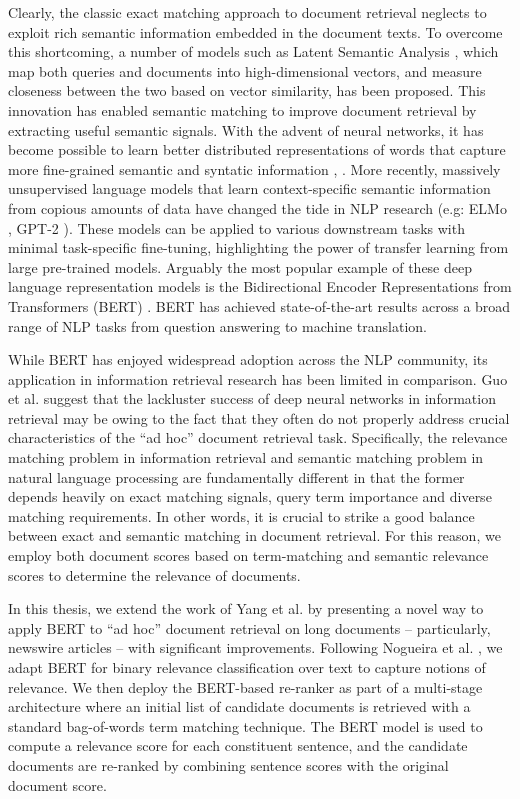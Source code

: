 Clearly, the classic exact matching approach to document retrieval neglects to exploit rich semantic information embedded in the document texts.
To overcome this shortcoming, a number of models such as Latent Semantic Analysis \cite{deerwester1990indexing}, which map both queries and documents into high-dimensional vectors, and measure closeness between the two based on vector similarity, has been proposed.
This innovation has enabled semantic matching to improve document retrieval by extracting useful semantic signals.
With the advent of neural networks, it has become possible to learn better distributed representations of words that capture more fine-grained semantic and syntatic information \cite{mikolov2013distributed}, \cite{pennington2014glove}.
More recently, massively unsupervised language models that learn context-specific semantic information from copious amounts of data have changed the tide in NLP research (e.g: ELMo \cite{peters2018deep}, GPT-2 \cite{radford2019language}).
These models can be applied to various downstream tasks with minimal task-specific fine-tuning, highlighting the power of transfer learning from large pre-trained models.
Arguably the most popular example of these deep language representation models is the Bidirectional Encoder Representations from Transformers (BERT) \cite{devlin2018bert}.
BERT has achieved state-of-the-art results across a broad range of NLP tasks from question answering to machine translation.

While BERT has enjoyed widespread adoption across the NLP community, its application in information retrieval research has been limited in comparison.
Guo et al. \cite{guo2016deep} suggest that the lackluster success of deep neural networks in information retrieval may be owing to the fact that they often do not properly address crucial characteristics of the ``ad hoc'' document retrieval task.
Specifically, the relevance matching problem in information retrieval and semantic matching problem in natural language processing are fundamentally different in that the former depends heavily on exact matching signals, query term importance and diverse matching requirements.
In other words, it is crucial to strike a good balance between exact and semantic matching in document retrieval.
For this reason, we employ both document scores based on term-matching and semantic relevance scores to determine the relevance of documents.

In this thesis, we extend the work of Yang et al. \cite{yang2019simple} by presenting a novel way to apply BERT to ``ad hoc'' document retrieval on long documents -- particularly, newswire articles -- with significant improvements.
Following Nogueira et al. \cite{nogueira2019passage}, we adapt BERT for binary relevance classification over text to capture notions of relevance.
We then deploy the BERT-based re-ranker as part of a multi-stage architecture where an initial list of candidate documents is retrieved with a standard bag-of-words term matching technique.
The BERT model is used to compute a relevance score for each constituent sentence, and the candidate documents are re-ranked by combining sentence scores with the original document score.

